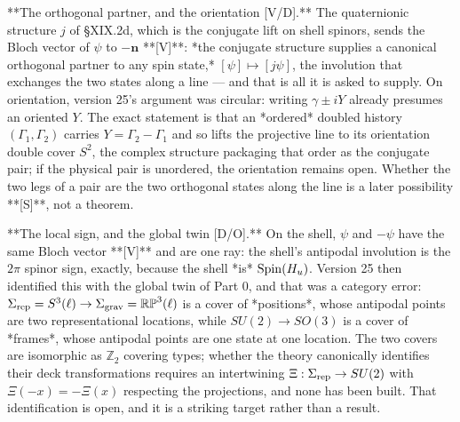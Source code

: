 **The orthogonal partner, and the orientation [V/D].** The quaternionic structure $j$ of §XIX.2d, which is the conjugate lift on shell spinors, sends the Bloch vector of $\psi$ to $-\mathbf n$ **[V]**: *the conjugate structure supplies a canonical orthogonal partner to any spin state,* $[\psi]\mapsto[j\psi]$, the involution that exchanges the two states along a line — and that is all it is asked to supply. On orientation, version 25's argument was circular: writing $\gamma\pm iY$ already presumes an oriented $Y$. The exact statement is that an *ordered* doubled history $(\Gamma_1,\Gamma_2)$ carries $Y = \Gamma_2-\Gamma_1$ and so lifts the projective line to its orientation double cover $S^2$, the complex structure packaging that order as the conjugate pair; if the physical pair is unordered, the orientation remains open. Whether the two legs of a pair are the two orthogonal states along the line is a later possibility **[S]**, not a theorem.

**The local sign, and the global twin [D/O].** On the shell, $\psi$ and $-\psi$ have the same Bloch vector **[V]** and are one ray: the shell's antipodal involution is the $2\pi$ spinor sign, exactly, because the shell *is* ${\rm Spin}(H_u)$. Version 25 then identified this with the global twin of Part 0, and that was a category error: $\Sigma_{\rm rep} = S^3(\ell)\to\Sigma_{\rm grav} = \mathbb{RP}^3(\ell)$ is a cover of *positions*, whose antipodal points are two representational locations, while $SU(2)\to SO(3)$ is a cover of *frames*, whose antipodal points are one state at one location. The two covers are isomorphic as $\mathbb Z_2$ covering types; whether the theory canonically identifies their deck transformations requires an intertwining $\Xi:\Sigma_{\rm rep}\to SU(2)$ with $\Xi(-x) = -\Xi(x)$ respecting the projections, and none has been built. That identification is open, and it is a striking target rather than a result.

